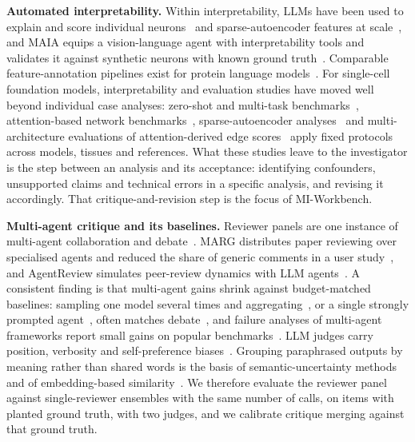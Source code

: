 \noindent\textbf{Automated interpretability.} Within interpretability, LLMs have been used to explain and score individual neurons~\cite{bills2023language} and sparse-autoencoder features at scale~\cite{paulo2025autointerp}, and MAIA equips a vision-language agent with interpretability tools and validates it against synthetic neurons with known ground truth~\cite{shaham2024maia}. Comparable feature-annotation pipelines exist for protein language models~\cite{simon2025interplm,gujral2025sae}. For single-cell foundation models, interpretability and evaluation studies have moved well beyond individual case analyses: zero-shot and multi-task benchmarks~\cite{kedzierska2025zeroshot,boiarsky2023deepdive,liu2026sceval}, attention-based network benchmarks~\cite{kalfon2025scprint,ye2026grnbenchmark}, sparse-autoencoder analyses~\cite{pedrocchi2025sae} and multi-architecture evaluations of attention-derived edge scores~\cite{kendiukhov2026attention} apply fixed protocols across models, tissues and references. What these studies leave to the investigator is the step between an analysis and its acceptance: identifying confounders, unsupported claims and technical errors in a specific analysis, and revising it accordingly. That critique-and-revision step is the focus of MI-Workbench.

\noindent\textbf{Multi-agent critique and its baselines.} Reviewer panels are one instance of multi-agent collaboration and debate~\cite{li2023camel,wu2023autogen,qian2024chatdev,hong2023metagpt,du2024debate}. MARG distributes paper reviewing over specialised agents and reduced the share of generic comments in a user study~\cite{darcy2024marg}, and AgentReview simulates peer-review dynamics with LLM agents~\cite{jin2024agentreview}. A consistent finding is that multi-agent gains shrink against budget-matched baselines: sampling one model several times and aggregating~\cite{wang2023selfconsistency,li2024moreagents}, or a single strongly prompted agent~\cite{wang2024rethinking}, often matches debate~\cite{smit2024mad}, and failure analyses of multi-agent frameworks report small gains on popular benchmarks~\cite{cemri2025mast}. LLM judges carry position, verbosity and self-preference biases~\cite{zheng2023judging,wang2024fair}. Grouping paraphrased outputs by meaning rather than shared words is the basis of semantic-uncertainty methods~\cite{kuhn2023semantic,farquhar2024semantic} and of embedding-based similarity~\cite{reimers2019sbert}. We therefore evaluate the reviewer panel against single-reviewer ensembles with the same number of calls, on items with planted ground truth, with two judges, and we calibrate critique merging against that ground truth.


